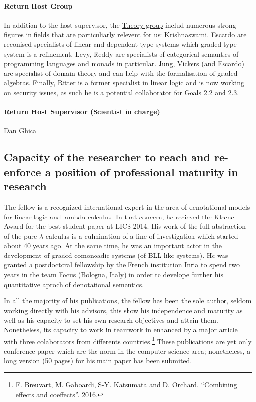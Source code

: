 \documentclass{article}[11pt]
\begin{document}
\paragraph{Return Host Group}
In addition to the host supervisor, the \href{http://www.cs.bham.ac.uk/research/groupings/theory/}{Theory group} includ numerous strong figures in fields that are particuliarly relevent for us: Krishnaswami, Escardo are reconised specialists of linear and dependent type systems which graded type system is a refinement. Levy, Reddy are specialists of categorical semantics of programming languages and monads in particular. Jung, Vickers (and Escardo) are specialist of domain theory and can help with the formalisation of graded algebras. Finally,  Ritter is a former specialist in linear logic and is now working on security issues, as such he is a potential collaborator for Goals 2.2 and 2.3. 

\paragraph{Return Host Supervisor (Scientist in charge)}
\href{http://www.cs.bham.ac.uk/~drg/}{Dan Ghica} 


\subsection{Capacity of the researcher to reach and re-enforce a position of professional maturity in research}

The fellow is a recognized international expert in the area of denotational models for linear logic and lambda calculus. In that concern, he recieved the Kleene Award for the best student paper at LICS 2014. His work of the full abstraction of the pure $\lambda$-calculus is a culmination of a line of investigation which started about 40 years ago. At the same time, he was an important actor in the development of graded comonoadic systems (of BLL-like systems). He was granted a postdoctoral fellowship by the French institution Inria to spend two years in the team Focus (Bologna, Italy) in order to develope further his quantitative aproch of denotational semantics.

In all the majority of his publications, the fellow has been the sole author, seldom working directly with his advisors, this show his independence and maturity as well as his capacity to set his own research objectives and attain them. Nonetheless, its capacity to work in teamwork in enhanced by a major article with three colaborators from differents countries.\footnote{F. Breuvart, M. Gaboardi, S-Y. Katsumata and D. Orchard. ``Combining effects and coeffects''. 2016.} These publications are yet only conference paper which are the norm in the computer science area; nonetheless, a long version (50 pages) for his main paper has been submited.
\end{document}
